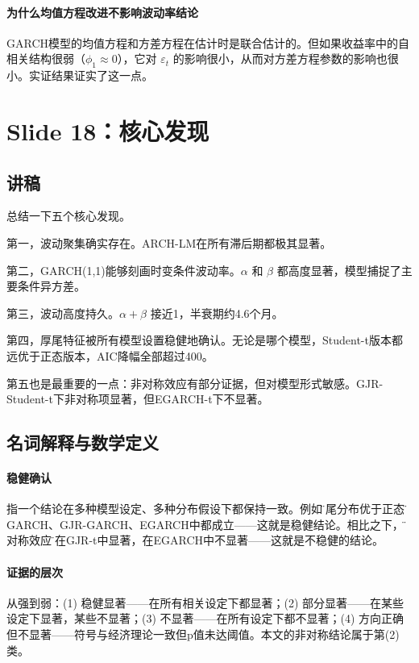 \documentclass[11pt,a4paper]{article}
\begin{document}
\paragraph{为什么均值方程改进不影响波动率结论} GARCH模型的均值方程和方差方程在估计时是联合估计的。但如果收益率中的自相关结构很弱（\(\phi_1 \approx 0\)），它对 \(\varepsilon_t\) 的影响很小，从而对方差方程参数的影响也很小。实证结果证实了这一点。

\newpage
\section*{Slide 18：核心发现}

\subsection*{讲稿}
总结一下五个核心发现。

第一，波动聚集确实存在。ARCH-LM在所有滞后期都极其显著。

第二，GARCH(1,1)能够刻画时变条件波动率。\(\alpha\) 和 \(\beta\) 都高度显著，模型捕捉了主要条件异方差。

第三，波动高度持久。\(\alpha+\beta\) 接近1，半衰期约4.6个月。

第四，厚尾特征被所有模型设置稳健地确认。无论是哪个模型，Student-t版本都远优于正态版本，AIC降幅全部超过400。

第五也是最重要的一点：非对称效应有部分证据，但对模型形式敏感。GJR-Student-t下非对称项显著，但EGARCH-t下不显著。

\subsection*{名词解释与数学定义}

\paragraph{稳健确认} 指一个结论在多种模型设定、多种分布假设下都保持一致。例如\"厚尾分布优于正态\"在GARCH、GJR-GARCH、EGARCH中都成立——这就是稳健结论。相比之下，\"非对称效应\"只在GJR-t中显著，在EGARCH中不显著——这就是不稳健的结论。

\paragraph{证据的层次} 从强到弱：(1) 稳健显著——在所有相关设定下都显著；(2) 部分显著——在某些设定下显著，某些不显著；(3) 不显著——在所有设定下都不显著；(4) 方向正确但不显著——符号与经济理论一致但p值未达阈值。本文的非对称结论属于第(2)类。
\end{document}
